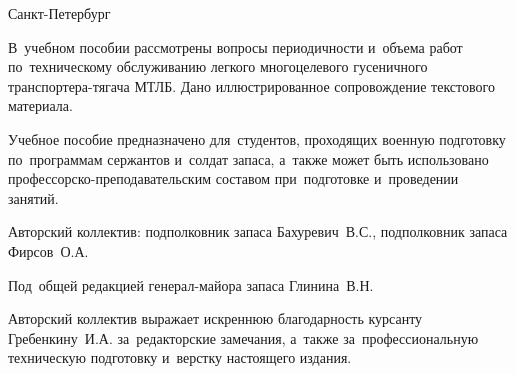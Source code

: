 \vfill

\begin{center}
Санкт-Петербург
\end{center}

\clearpage
\thispagestyle{empty}

\vspace*{\fill}
{
    
    \noindent
    В~учебном пособии рассмотрены вопросы периодичности и~объема работ по~техническому обслуживанию легкого многоцелевого гусеничного транспортера-тягача МТЛБ. Дано иллюстрированное сопровождение текстового материала.
    
    \medskip

    \noindent
    Учебное  пособие предназначено для~студентов, проходящих военную подготовку по~программам сержантов и~солдат запаса, а~также может быть использовано профессорско-преподавательским составом при~подготовке и~проведении занятий.
    
    \medskip
    
    \noindent
    Авторский коллектив: подполковник запаса Бахуревич~В.С., подполковник запаса Фирсов~О.А.
    
    \medskip
    
    \noindent
    Под~общей редакцией генерал-майора запаса Глинина~В.Н.
    
    \medskip
    
    \noindent
    Авторский коллектив выражает искреннюю благодарность курсанту Гребенкину~И.А. за~редакторские замечания, а~также за~профессиональную техническую подготовку и~верстку настоящего издания.
}

\vspace*{\fill}